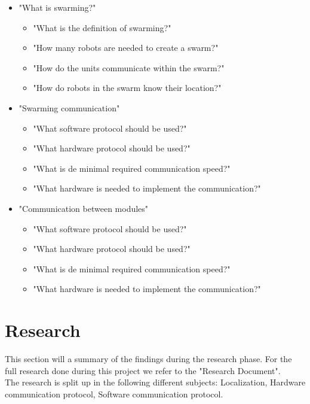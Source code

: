 \documentclass[10pt,a4paper]{article}
\begin{document}
\begin{itemize}

    \item "What is swarming?"
    \begin{itemize}
        \item "What is the definition of swarming?"
        \item "How many robots are needed to create a swarm?"
        \item "How do the units communicate within the swarm?"
        \item "How do robots in the swarm know their location?"
    \end{itemize}    
    \item "Swarming communication"
    \begin{itemize}
        \item "What software protocol should be used?"
        \item "What hardware protocol should be used?"
        \item "What is de minimal required communication speed?"
        \item "What hardware is needed to implement the communication?"
    \end{itemize}
     \item "Communication between modules"
    \begin{itemize}
        \item "What software protocol should be used?"
        \item "What hardware protocol should be used?"
        \item "What is de minimal required communication speed?"
        \item "What hardware is needed to implement the communication?"
    \end{itemize}
 \end{itemize}

\newpage


\section{Research}
This section will a summary of the findings during the research phase. For the full research done during this project we refer to the "Research Document". \\
The research is split up in the following different subjects: Localization, Hardware communication protocol, Software communication protocol.
\end{document}
